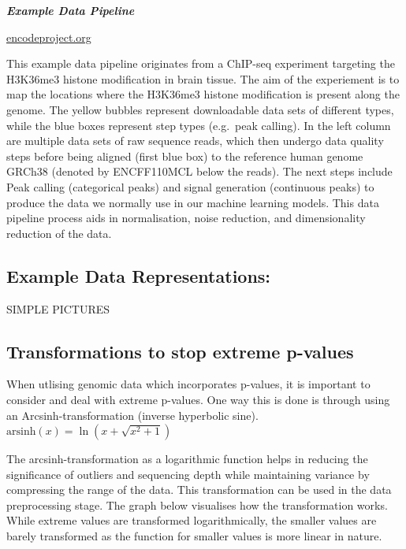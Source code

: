 \documentclass[
]{book}
\begin{document}
\textbf{\emph{Example Data Pipeline}}

\href{https://www.encodeproject.org/experiments/ENCSR817LUF/}{encodeproject.org}

This example data pipeline originates from a ChIP-seq experiment targeting the H3K36me3 histone modification in brain tissue. The aim of the experiement is to map the locations where the H3K36me3 histone modification is present along the genome. The yellow bubbles represent downloadable data sets of different types, while the blue boxes represent step types (e.g.~peak calling). In the left column are multiple data sets of raw sequence reads, which then undergo data quality steps before being aligned (first blue box) to the reference human genome GRCh38 (denoted by ENCFF110MCL below the reads). The next steps include Peak calling (categorical peaks) and signal generation (continuous peaks) to produce the data we normally use in our machine learning models. This data pipeline process aids in normalisation, noise reduction, and dimensionality reduction of the data.

\subsection{Example Data Representations:}\label{example-data-representations}

SIMPLE PICTURES

\subsection{Transformations to stop extreme p-values}\label{transformations-to-stop-extreme-p-values}

When utlising genomic data which incorporates p-values, it is important to consider and deal with extreme p-values. One way this is done is through using an Arcsinh-transformation (inverse hyperbolic sine).
\(\text{arsinh}(x) = \ln \left( x + \sqrt{x^2 + 1} \right)\)

The arcsinh-transformation as a logarithmic function helps in reducing the significance of outliers and sequencing depth while maintaining variance by compressing the range of the data. This transformation can be used in the data preprocessing stage. The graph below visualises how the transformation works. While extreme values are transformed logarithmically, the smaller values are barely transformed as the function for smaller values is more linear in nature.
\end{document}
